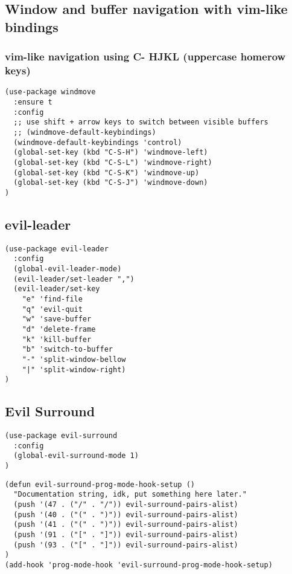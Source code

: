 \documentclass[11pt]{article}
\begin{document}
\subsection*{Window and buffer navigation with vim-like bindings}
\label{sec:org51bc9c9}

\subsubsection*{vim-like navigation using C- HJKL (uppercase homerow keys)}
\label{sec:org93a2d3a}
\begin{verbatim}
(use-package windmove
  :ensure t
  :config
  ;; use shift + arrow keys to switch between visible buffers
  ;; (windmove-default-keybindings)
  (windmove-default-keybindings 'control)
  (global-set-key (kbd "C-S-H") 'windmove-left)
  (global-set-key (kbd "C-S-L") 'windmove-right)
  (global-set-key (kbd "C-S-K") 'windmove-up)
  (global-set-key (kbd "C-S-J") 'windmove-down)
)
\end{verbatim}




\subsection*{evil-leader}
\label{sec:org88493c4}

\begin{verbatim}
(use-package evil-leader
  :config
  (global-evil-leader-mode)
  (evil-leader/set-leader ",")
  (evil-leader/set-key
    "e" 'find-file
    "q" 'evil-quit
    "w" 'save-buffer
    "d" 'delete-frame
    "k" 'kill-buffer
    "b" 'switch-to-buffer
    "-" 'split-window-bellow
    "|" 'split-window-right)
)
\end{verbatim}

\subsection*{Evil Surround}
\label{sec:orgd80df70}

\begin{verbatim}
(use-package evil-surround
  :config
  (global-evil-surround-mode 1)
)
\end{verbatim}

\begin{verbatim}
(defun evil-surround-prog-mode-hook-setup ()
  "Documentation string, idk, put something here later."
  (push '(47 . ("/" . "/")) evil-surround-pairs-alist)
  (push '(40 . ("(" . ")")) evil-surround-pairs-alist)
  (push '(41 . ("(" . ")")) evil-surround-pairs-alist)
  (push '(91 . ("[" . "]")) evil-surround-pairs-alist)
  (push '(93 . ("[" . "]")) evil-surround-pairs-alist)
)
(add-hook 'prog-mode-hook 'evil-surround-prog-mode-hook-setup)
\end{verbatim}
\end{document}
